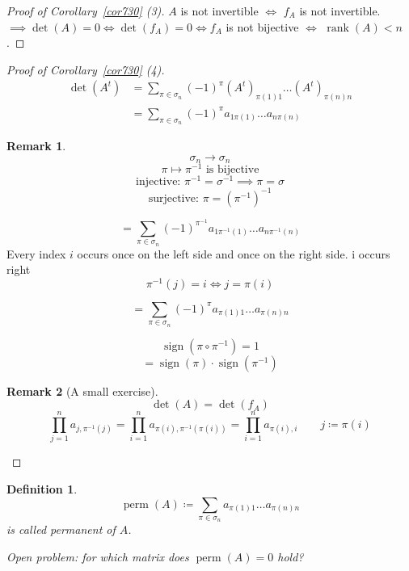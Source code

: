 \documentclass[a4paper]{article}
\newcounter{lecref}[section]
\numberwithin{lecref}{section}
\newtheorem{definition}[lecref]{Definition}
\newtheorem*{Remark}{Remark}
\DeclareMathOperator{\perm}{perm}
\DeclareMathOperator{\sign}{sign}
\begin{document}
\begin{proof}[Proof of Corollary~\ref{cor730} (3)]
  $A$ is not invertible $\iff$ $f_A$ is not invertible.
  $\implies \det(A) = 0 \iff \det(f_A) = 0 \iff f_A$ is not bijective $\iff$ $\operatorname{rank}(A) < n$.
\end{proof}

\begin{proof}[Proof of Corollary~\ref{cor730} (4)]
  \begin{align*}
    \det(A^t) &= \sum_{\pi \in \sigma_n} (-1)^\pi (A^t)_{\pi(1) 1} \dots (A^t)_{\pi(n) n} \\
      &= \sum_{\pi \in \sigma_n} (-1)^\pi a_{1 \pi(1)} \dots a_{n \pi(n)}
  \end{align*}

  \begin{Remark}
    \[ \sigma_n \to \sigma_n \]
    \[ \pi \mapsto \pi^{-1} \text{ is bijective} \]
    \[ \text{injective: } \pi^{-1} = \sigma^{-1} \implies \pi = \sigma \]
    \[ \text{surjective: } \pi = (\pi^{-1})^{-1} \]
  \end{Remark}

  \[ = \sum_{\pi \in \sigma_n} (-1)^{\pi^{-1}} a_{1 \pi^{-1}(1)} \dots a_{n \pi^{-1}(n)} \]
  Every index $i$ occurs once on the left side and once on the right side. i occurs right
  \[ \pi^{-1}(j) = i  \iff  j = \pi(i) \]

  \[ = \sum_{\pi \in \sigma_n} (-1)^\pi a_{\pi(1) 1} \dots a_{\pi(n) n} \]

  \[ \sign(\pi \circ \pi^{-1}) = 1 \]
  \[ = \sign(\pi) \cdot \sign(\pi^{-1}) \]

  \begin{Remark}[A small exercise]
    \[ \det(A) = \det(f_A) \]
    \[
      \prod_{j=1}^n a_{j, \pi^{-1}(j)}
      = \prod_{i=1}^n a_{\pi(i), \pi^{-1}(\pi(i))}
      = \prod_{i=1}^n a_{\pi(i), i}
      \qquad j \coloneqq \pi(i)
    \]
  \end{Remark}
\end{proof}

\begin{definition}
  \[ \perm(A) \coloneqq \sum_{\pi \in \sigma_n} a_{\pi(1) 1} \dots a_{\pi(n) n} \]
  is called \emph{permanent of $A$}.

  Open problem: for which matrix does $\perm(A) = 0$ hold?
\end{definition}
\end{document}
